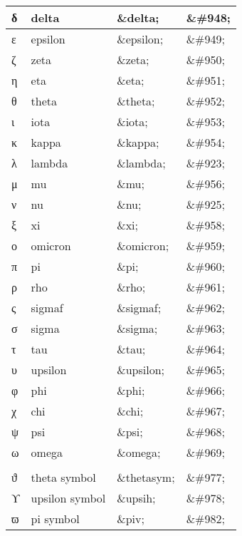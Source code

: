 \begin{longtable}{|l|l|l|l|}
\hline
δ	&delta	&\&delta;	&\&\#948;\\
\hline
ε	&epsilon	&\&epsilon;	&\&\#949;\\
\hline
ζ	&zeta	&\&zeta;		&\&\#950;\\
\hline
η	&eta	&\&eta;		&\&\#951;\\
\hline
θ	&theta	&\&theta;	&\&\#952;\\
\hline
ι	&iota	&\&iota;		&\&\#953;\\
\hline
κ	&kappa	&\&kappa;	&\&\#954;\\
\hline
λ	&lambda	&\&lambda;	&\&\#923;\\
\hline
μ	&mu		&\&mu;		&\&\#956;\\
\hline
ν	&nu		&\&nu;		&\&\#925;\\
\hline
ξ	&xi		&\&xi;		&\&\#958;\\
\hline
ο	&omicron	&\&omicron;	&\&\#959;\\
\hline
π	&pi		&\&pi;		&\&\#960;\\
\hline
ρ	&rho	&\&rho;		&\&\#961;\\
\hline
ς	&sigmaf	&\&sigmaf;	&\&\#962;\\
\hline
σ	&sigma	&\&sigma;	&\&\#963;\\
\hline
τ	&tau	&\&tau;		&\&\#964;\\
\hline
υ	&upsilon	&\&upsilon;	&\&\#965;\\
\hline
φ	&phi		&\&phi;		&\&\#966;\\
\hline
χ	&chi		&\&chi;		&\&\#967;\\
\hline
ψ	&psi		&\&psi;		&\&\#968;\\
\hline
ω	&omega	&\&omega;	&\&\#969;\\
\hline
 \multicolumn{4}{|l|}{}				\\
\hline
ϑ	&theta symbol	&\&thetasym;	&\&\#977;\\
\hline
ϒ	&upsilon symbol	&\&upsih;	&\&\#978;\\
\hline
ϖ	&pi symbol		&\&piv;		&\&\#982;\\
\hline
\end{longtable}



